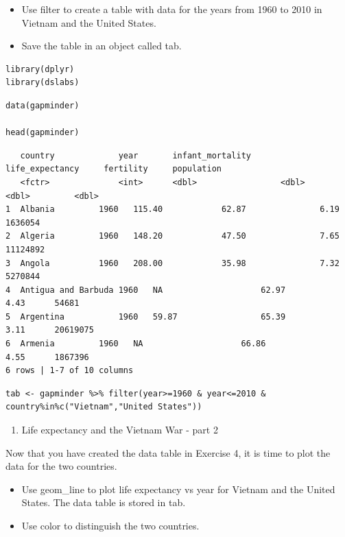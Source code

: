 \documentclass[
]{article}
\providecommand{\tightlist}{%
  \setlength{\itemsep}{0pt}\setlength{\parskip}{0pt}}
\begin{document}
\begin{itemize}
\tightlist
\item
  Use filter to create a table with data for the years from 1960 to 2010
  in Vietnam and the United States.
\item
  Save the table in an object called tab.
\end{itemize}

\begin{verbatim}
library(dplyr)
library(dslabs)
\end{verbatim}

\begin{verbatim}
data(gapminder)

head(gapminder)
\end{verbatim}

\begin{verbatim}
   country             year       infant_mortality      life_expectancy     fertility     population
   <fctr>              <int>      <dbl>                 <dbl>               <dbl>         <dbl>
1  Albania         1960   115.40            62.87               6.19      1636054   
2  Algeria         1960   148.20            47.50               7.65      11124892  
3  Angola          1960   208.00            35.98               7.32      5270844   
4  Antigua and Barbuda 1960   NA                    62.97               4.43      54681 
5  Argentina           1960   59.87                 65.39               3.11      20619075  
6  Armenia         1960   NA                    66.86               4.55      1867396   
6 rows | 1-7 of 10 columns
\end{verbatim}

\begin{verbatim}
tab <- gapminder %>% filter(year>=1960 & year<=2010 & country%in%c("Vietnam","United States"))
\end{verbatim}

\begin{enumerate}
\def\labelenumi{\arabic{enumi}.}
\setcounter{enumi}{4}
\tightlist
\item
  Life expectancy and the Vietnam War - part 2
\end{enumerate}

Now that you have created the data table in Exercise 4, it is time to
plot the data for the two countries.

\begin{itemize}
\tightlist
\item
  Use geom\_line to plot life expectancy vs year for Vietnam and the
  United States. The data table is stored in tab.
\item
  Use color to distinguish the two countries.
\end{itemize}
\end{document}

